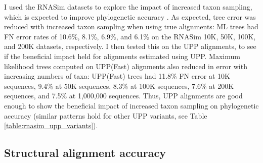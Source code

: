 I used the RNASim datasets to explore the 
impact of increased taxon sampling, which  is expected to improve
phylogenetic accuracy \cite{zwickl_increased_2002}.
As expected, tree error was reduced with increased
taxon sampling when using 
true alignments:
ML trees had  
FN error rates of
10.6\%, 8.1\%, 6.9\%, and 6.1\% on the RNASim 10K, 50K, 100K, and 200K datasets, 
respectively. %
I then tested this on the UPP alignments, to see if the
 beneficial impact
held for alignments estimated using UPP.
Maximum likelihood trees computed on 
UPP(Fast) alignments also reduced in error 
with increasing numbers of taxa:
UPP(Fast) trees had 11.8\% FN error
at 10K sequences, 9.4\% at 50K
sequences, 8.3\% at 100K sequences, 7.6\% at 200K sequences, and
7.5\% at 1,000,000 sequences.
Thus, UPP alignments are good enough to show the beneficial
impact of increased taxon sampling on phylogenetic accuracy (similar
patterns hold for other UPP variants, see Table \ref{table:rnasim_upp_variants}).


\subsection{Structural alignment accuracy}


